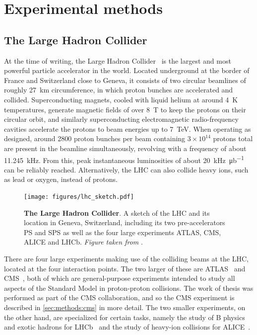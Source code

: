 \chapter{Experimental methods}
\label{ch:methods}

\section{The Large Hadron Collider}
\label{sec:methods:lhc}

At the time of writing, the Large Hadron Collider~\cite{Bruning:2004ej} is the largest and most powerful particle accelerator in the world. Located underground at the border of France and Switzerland close to Geneva, it consists of two circular beamlines of roughly 27~km circumference, in which proton bunches are accelerated and collided. Superconducting magnets, cooled with liquid helium at around 4~K temperatures, generate magnetic fields of over 8~T to keep the protons on their circular orbit, and similarly superconducting electromagnetic radio-frequency cavities accelerate the protons to beam energies up to 7~TeV. When operating as designed, around 2800 proton bunches per beam containing $3\times10^{14}$ protons total are present in the beamline simultaneously, revolving with a frequency of about 11.245~kHz. From this, peak instantaneous luminosities of about \SI{20}{\kilo\hertz\per\micro\barn} can be reliably reached. Alternatively, the LHC can also collide heavy ions, such as lead or oxygen, instead of protons.

\begin{figure}[!t]
    \centering
    \texttt{[image: figures/lhc\_sketch.pdf]}
    \caption{\textbf{The Large Hadron Collider}. A sketch of the LHC and its location in Geneva, Switzerland, including its two pre-accelerators PS and SPS as well as the four large experiments ATLAS, CMS, ALICE and LHCb. \textit{Figure taken from }.}
\end{figure}

There are four large experiments making use of the colliding beams at the LHC, located at the four interaction points. The two larger of these are ATLAS~\cite{ATLAS:2008xda} and CMS~\cite{CMS:2008xjf}, both of which are general-purpose experiments intended to study all aspects of the Standard Model in proton-proton collisions. The work of thesis was performed as part of the CMS collaboration, and so the CMS experiment is described in \cref{sec:methods:cms} in more detail. The two smaller experiments, on the other hand, are specialized for certain tasks, namely the study of B physics and exotic hadrons for LHCb~\cite{LHCb:2008vvz} and the study of heavy-ion collisions for ALICE~\cite{ALICE:2008ngc}.

